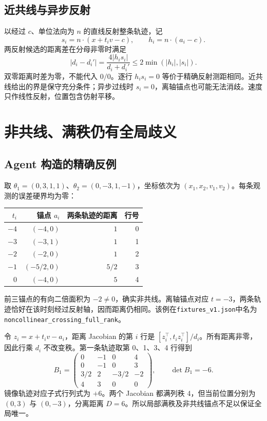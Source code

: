 \documentclass[UTF8,a4paper,zihao=-4,fontset=none]{ctexart}
\newcommand{\code}[1]{{\small\nolinkurl{#1}}}
\begin{document}
\subsection{近共线与异步反射}
以经过 $c$、单位法向为 $n$ 的直线反射整条轨迹，记
\[
s_i=n\cdot(x+t_i v-c),\qquad h_i=n\cdot(a_i-c).
\]
两反射候选的距离差在分母非零时满足
\[
|d_i-d_i'|=\frac{4|h_i s_i|}{d_i+d_i'}\le2\min(|h_i|,|s_i|).
\]
双零距离时差为零，不能代入 $0/0$。逐行 $h_i s_i=0$ 等价于精确反射测距相同。近共线给出的界是保守充分条件；异步过线时 $s_i=0$，离轴锚点也可能无法消歧。速度只作线性反射，位置包含仿射平移。

\newpage
\section{非共线、满秩仍有全局歧义}
\subsection{Agent 构造的精确反例}
取 $\theta_1=(0,3,1,1)$、$\theta_2=(0,-3,1,-1)$，坐标依次为 $(x_1,x_2,v_1,v_2)$。每条观测的误差硬界均为零：
\begin{center}
\begin{tabular}{@{}rrrr@{}}
\toprule
$t_i$ & 锚点 $a_i$ & 两条轨迹的距离 & 行号 \\
\midrule
$-4$ & $(-4,0)$ & $1$ & 0 \\
$-3$ & $(-3,1)$ & $1$ & 1 \\
$-2$ & $(-2,0)$ & $1$ & 2 \\
$-1$ & $(-5/2,0)$ & $5/2$ & 3 \\
$0$ & $(-4,0)$ & $5$ & 4 \\
\bottomrule
\end{tabular}
\end{center}
前三锚点的有向二倍面积为 $-2\ne0$，确实非共线。离轴锚点对应 $t=-3$，两条轨迹恰好在该时刻经过反射轴，因而距离仍相同。该例在\code{fixtures_v1.json}中名为\code{noncollinear_crossing_full_rank}。

令 $z_i=x+t_i v-a_i$，距离 Jacobian 的第 $i$ 行是 $[z_i^\top,t_i z_i^\top]/d_i$。所有距离非零，因此行乘 $d_i$ 不改变秩。第一条轨迹取第 0、1、3、4 行得到
\[
B_1=\begin{pmatrix}
0&-1&0&4\\
0&-1&0&3\\
3/2&2&-3/2&-2\\
4&3&0&0
\end{pmatrix},\qquad \det B_1=-6.
\]
镜像轨迹对应子式行列式为 $+6$。两个 Jacobian 都满列秩 4，但当前位置分别为 $(0,3)$ 与 $(0,-3)$，分离距离 $D=6$。所以局部满秩及非共线锚点不足以保证全局唯一。
\end{document}
